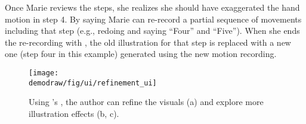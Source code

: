 Once Marie reviews the steps, she realizes she should have exaggerated the hand motion in step 4. By saying  Marie can re-record a partial sequence of movements including that step (e.g., redoing and saying ``Four'' and ``Five'').
When she ends the re-recording with , the old illustration for that step is replaced with a new one (step four in this example) generated using the new motion recording.
%
%

\begin{figure*}[t!]
  \centering
  \texttt{[image: \\demodraw/fig/ui/refinement\_ui]}
  \caption{Using \systemname{}'s \phaseII{}, the author can refine the visuals (a) and explore more illustration effects (b, c).}
  \label{fig:DemoDrawRefinementUI}
\end{figure*}

